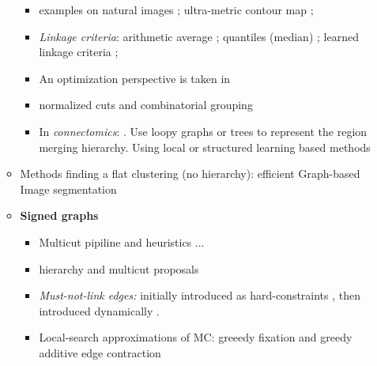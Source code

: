 \begin{itemize}
\begin{itemize}
\begin{itemize}
\item examples on natural images \cite{ren2013image,liu2016image}; ultra-metric contour map \cite{arbelaez2011contour};
\item \emph{Linkage criteria}: arithmetic average \cite{liu2018affinity,lee2017superhuman}; 
quantiles (median) \cite{funke2018large}; %
   learned linkage criteria \cite{nunez2013machine}; 
\item An optimization perspective is taken in \cite{kiran2014global} %
\item normalized cuts and combinatorial grouping \cite{arbelaez2014multiscale}
\item In \emph{connectomics}: \cite{liu2016sshmt}. Use loopy graphs \cite{kaynig2015large,krasowski2015improving} or trees \cite{liu2016sshmt,liu2014modular,funke2015learning,uzunbas2016efficient} to represent the region merging hierarchy. Using local \cite{liu2014modular,krasowski2015improving} or structured \cite{funke2015learning,uzunbas2016efficient} learning based methods %
\end{itemize}
\item Methods finding a flat clustering (no hierarchy): efficient Graph-based Image segmentation \cite{felzenszwalb2004efficient} %
\item \textbf{Signed graphs} 
\begin{itemize}
    \item Multicut pipiline and heuristics \cite{beier2017multicut}... 

\item hierarchy and multicut proposals \cite{funke2018candidate}
\item \textit{Must-not-link edges:} initially introduced as hard-constraints \cite{malmberg2011generalized}, then introduced dynamically \cite{wolf2018mutex,levinkov2017comparative}. 
\item Local-search approximations of MC: greeedy fixation and greedy additive edge contraction \cite{levinkov2017comparative}
\end{itemize}
\end{itemize}

\end{itemize}

